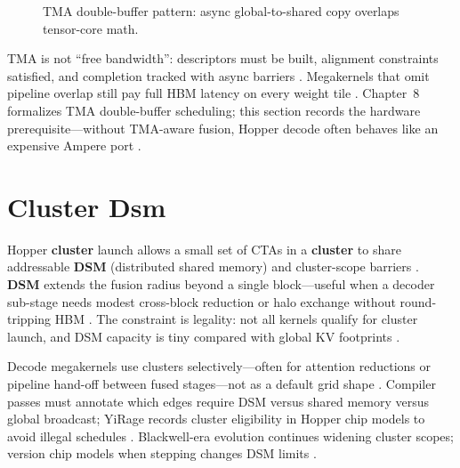 \begin{figure}[t]
\centering
{}
\caption{TMA double-buffer pattern: async global-to-shared copy overlaps tensor-core math.}
\label{fig:tma_pipeline}
\end{figure}

TMA is not ``free bandwidth'': descriptors must be built, alignment constraints satisfied, and completion tracked with async barriers \citep{nvidia2022hopper,semianalysis2024tma}.
Megakernels that omit pipeline overlap still pay full HBM latency on every weight tile \citep{memoryfloor2026}.
Chapter~8 formalizes TMA double-buffer scheduling; this section records the hardware prerequisite---without TMA-aware fusion, Hopper decode often behaves like an expensive Ampere port \citep{semianalysis2024tma,patel2025llminference}.

\section{Cluster Dsm}
\label{sec:cluster_dsm}

Hopper \textbf{cluster} launch allows a small set of CTAs in a \textbf{cluster} to share addressable \textbf{DSM} (distributed shared memory) and cluster-scope barriers \citep{nvidia2022hopper,semianalysis2024tma}.
\textbf{DSM} extends the fusion radius beyond a single block---useful when a decoder sub-stage needs modest cross-block reduction or halo exchange without round-tripping HBM \citep{nvidia2022hopper}.
The constraint is legality: not all kernels qualify for cluster launch, and DSM capacity is tiny compared with global KV footprints \citep{semianalysis2024tma,memoryfloor2026}.

Decode megakernels use clusters selectively---often for attention reductions or pipeline hand-off between fused stages---not as a default grid shape \citep{patel2025llminference}.
Compiler passes must annotate which edges require DSM versus shared memory versus global broadcast; YiRage records cluster eligibility in Hopper chip models to avoid illegal schedules \citep{patel2025llminference,nvidia2022hopper}.
Blackwell-era evolution continues widening cluster scopes; version chip models when stepping changes DSM limits \citep{semianalysis2024tma}.

